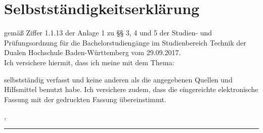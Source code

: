 
\thispagestyle{plain}
\vspace*{1em}
\section*{Selbstständigkeitserklärung}
\vspace*{2em}

gemäß Ziffer 1.1.13 der Anlage 1 zu §§ 3, 4 und 5  der Studien- und Prüfungsordnung für die Bachelorstudiengänge im Studienbereich Technik der Dualen Hochschule Baden-Württemberg vom 29.09.2017.\\
Ich versichere hiermit, dass ich meine {\arbeit} mit dem Thema: \begin{center}{\itshape{}\titel{}\/}\end{center} selbstständig verfasst und keine anderen als die angegebenen Quellen und Hilfsmittel benutzt habe. Ich versichere zudem, dass die eingereichte elektronische Fassung mit der gedruckten Fassung übereinstimmt.

\vspace{3em}

\abgabeort, \datumAbgabe
\vspace{4em}

\rule{6cm}{0.4pt}\\
\autor
